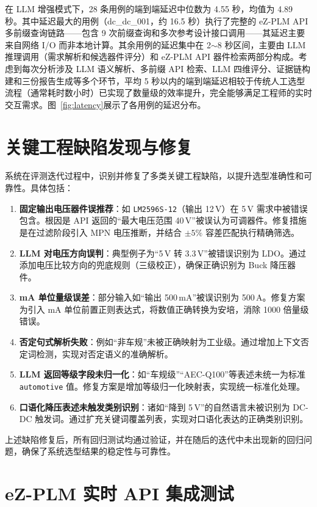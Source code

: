 在 LLM 增强模式下，28 条用例的端到端延迟中位数为 4.55 秒，均值为 4.89 秒。其中延迟最大的用例（dc\_dc\_001，约 16.5 秒）执行了完整的 eZ-PLM API 多前缀查询链路——包含 9 次前缀查询和多次参考设计接口调用——其延迟主要来自网络 I/O 而非本地计算。其余用例的延迟集中在 2$\sim$8 秒区间，主要由 LLM 推理调用（需求解析和候选器件评分）和 eZ-PLM API 器件检索两部分构成。考虑到每次分析涉及 LLM 语义解析、多前缀 API 检索、LLM 四维评分、证据链构建和三份报告生成等多个环节，平均 5 秒以内的端到端延迟相较于传统人工选型流程（通常耗时数小时）已实现了数量级的效率提升，完全能够满足工程师的实时交互需求。图~\ref{fig:latency}展示了各用例的延迟分布。

\section{关键工程缺陷发现与修复}

系统在评测迭代过程中，识别并修复了多类关键工程缺陷，以提升选型准确性和可靠性。具体包括：
\begin{enumerate}
    \item \textbf{固定输出电压器件误推荐}：如 \texttt{LM2596S-12}（输出 12\,V）在 5\,V 需求中被错误包含。根因是 API 返回的“最大电压范围 40\,V”被误认为可调器件。修复措施是在过滤阶段引入 MPN 电压推断，并结合 $\pm 5\%$ 容差匹配执行精确筛选。
    \item \textbf{LLM 对电压方向误判}：典型例子为“5\,V 转 3.3\,V”被错误识别为 LDO。通过添加电压比较方向的兜底规则（三级校正），确保正确识别为 Buck 降压器件。
    \item \textbf{mA 单位量级误差}：部分输入如“输出 500\,mA”被误识别为 500\,A。修复方案为引入 mA 单位前置正则表达式，将数值正确转换为安培，消除 1000 倍量级错误。
    \item \textbf{否定句式解析失败}：例如“非车规”未被正确映射为工业级。通过增加上下文否定词检测，实现对否定语义的准确解析。
    \item \textbf{LLM 返回等级字段未归一化}：如“车规级”“AEC-Q100”等表述未统一为标准 \texttt{automotive} 值。修复方案是增加等级归一化映射表，实现统一标准化处理。
    \item \textbf{口语化降压表述未触发类别识别}：诸如“降到 5\,V”的自然语言未被识别为 DC-DC 触发词。通过扩充关键词覆盖列表，实现对口语化表达的正确类别识别。
\end{enumerate}

上述缺陷修复后，所有回归测试均通过验证，并在随后的迭代中未出现新的回归问题，确保了系统选型结果的稳定性与可靠性。

\section{eZ-PLM 实时 API 集成测试}

